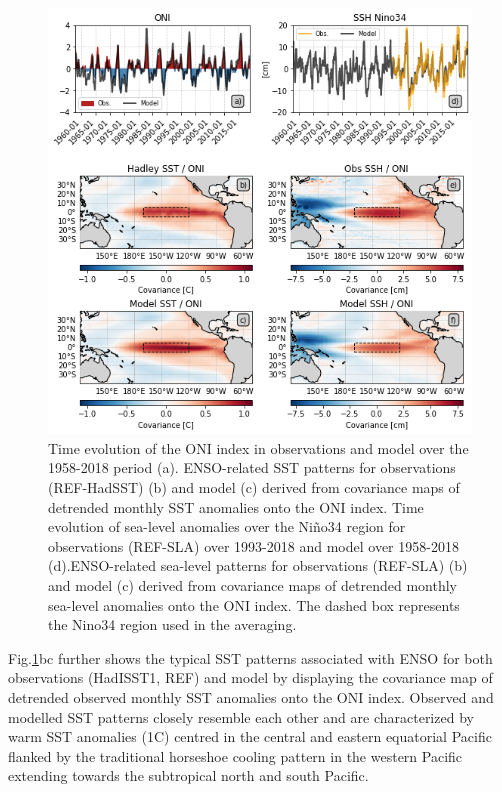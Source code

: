 \begin{figure}[h!tp]
	\centering
	\includegraphics[scale=0.6]{figs/fig1.png}
	\caption{Time evolution of the ONI index in observations and model over the 1958-2018 period (a). ENSO-related SST patterns for observations (REF-HadSST) (b) and model (c) derived from covariance maps of detrended monthly SST anomalies onto the ONI index. Time evolution of sea-level anomalies over the Niño34 region for observations (REF-SLA) over 1993-2018 and model over 1958-2018 (d).ENSO-related sea-level patterns for observations (REF-SLA) (b) and model (c) derived from covariance maps of detrended monthly sea-level anomalies onto the ONI index. The dashed box represents the Nino34 region used in the averaging.}
	\label{fig:nemo-had-sst}
\end{figure}

Fig.\ref{fig:nemo-had-sst}bc further shows the typical SST patterns associated with ENSO for both observations (HadISST1, REF) and model by displaying the covariance map of detrended observed monthly SST anomalies onto the ONI index. Observed and modelled SST patterns closely resemble each other and are characterized by warm SST anomalies (1\degree{}C) centred in the central and eastern equatorial Pacific  flanked by the traditional horseshoe cooling pattern in the western Pacific extending towards the subtropical north and south Pacific.    


